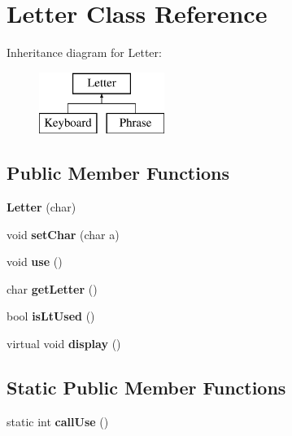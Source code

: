 \hypertarget{class_letter}{}\section{Letter Class Reference}
\label{class_letter}
Inheritance diagram for Letter\+:\begin{figure}[H]
\begin{center}
\leavevmode
\includegraphics[height=2.000000cm]{class_letter}
\end{center}
\end{figure}
\subsection*{Public Member Functions}
\begin{DoxyCompactItemize}
\item 
\hypertarget{class_letter_a3bee19251225ca9f2f958191a5a7daba}{}\label{class_letter_a3bee19251225ca9f2f958191a5a7daba} 
{\bfseries Letter} (char)
\item 
\hypertarget{class_letter_ab4c06bc667637903013f93cc30fcde58}{}\label{class_letter_ab4c06bc667637903013f93cc30fcde58} 
void {\bfseries set\+Char} (char a)
\item 
\hypertarget{class_letter_a3de38802f3c236230882da7b83f930c4}{}\label{class_letter_a3de38802f3c236230882da7b83f930c4} 
void {\bfseries use} ()
\item 
\hypertarget{class_letter_a3b48f5b3d03e4a48d34d5a40c2af5190}{}\label{class_letter_a3b48f5b3d03e4a48d34d5a40c2af5190} 
char {\bfseries get\+Letter} ()
\item 
\hypertarget{class_letter_ae6ee6c11da6b6980f3860325ab5a9af1}{}\label{class_letter_ae6ee6c11da6b6980f3860325ab5a9af1} 
bool {\bfseries is\+Lt\+Used} ()
\item 
\hypertarget{class_letter_a5c54b5095ed21b6c68a7c8ef2d33b1a0}{}\label{class_letter_a5c54b5095ed21b6c68a7c8ef2d33b1a0} 
virtual void {\bfseries display} ()
\end{DoxyCompactItemize}
\subsection*{Static Public Member Functions}
\begin{DoxyCompactItemize}
\item 
\hypertarget{class_letter_a99f0b819c673c8cd9891934ba7ca6121}{}\label{class_letter_a99f0b819c673c8cd9891934ba7ca6121} 
static int {\bfseries call\+Use} ()
\end{DoxyCompactItemize}
